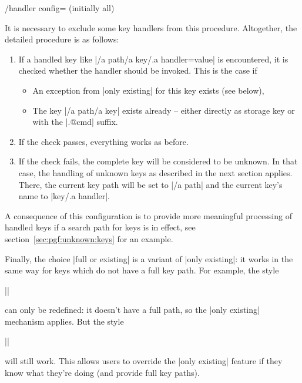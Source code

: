 \begin{key}{/handler config= (initially all)}
\begin{description}
\begin{codeexample}[]
\end{codeexample}
            It is necessary to exclude some key handlers from this procedure.
            Altogether, the detailed procedure is as follows:
            \begin{enumerate}
                \item If a handled key like |/a path/a key/.a handler=value| is
                    encountered, it is checked whether the handler should be
                    invoked. This is the case if
                    \begin{itemize}
                        \item An exception from |only existing| for this key
                            exists (see below),
                        \item The key |/a path/a key| exists already -- either
                            directly as storage key or with the |.@cmd| suffix.
                    \end{itemize}
                \item If the check passes, everything works as before.
                \item If the check fails, the complete key will be considered
                    to be unknown. In that case, the handling of unknown keys
                    as described in the next section applies. There, the
                    current key path will be set to |/a path| and the current
                    key's name to |key/.a handler|.
            \end{enumerate}

            A consequence of this configuration is to provide more meaningful
            processing of handled keys if a search path for keys is in effect,
            see section~\ref{sec:pgf:unknown:keys} for an example.
        \item[\texttt{full or existing}] Finally, the choice |full or existing|
            is a variant of |only existing|: it works in the same way for keys
            which do not have a full key path. For example, the style

            ||

            can only be redefined: it doesn't have a full path, so the
            |only existing| mechanism applies. But the style

            ||

            will still work. This allows users to override the |only existing|
            feature if they know what they're doing (and provide full key
            paths).
    \end{description}
\end{key}

